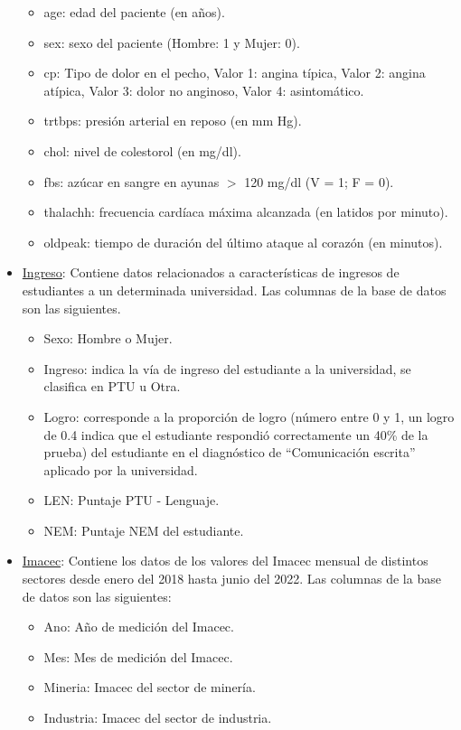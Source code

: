 \documentclass[
  11pt,
]{book}
\providecommand{\tightlist}{%
  \setlength{\itemsep}{0pt}\setlength{\parskip}{0pt}}
\theoremstyle{definition}
\theoremstyle{definition}
\theoremstyle{definition}
\theoremstyle{definition}
\theoremstyle{remark}
\begin{document}
\begin{itemize}
  \begin{itemize}
  \tightlist
  \item
    age: edad del paciente (en años).
  \item
    sex: sexo del paciente (Hombre: 1 y Mujer: 0).
  \item
    cp: Tipo de dolor en el pecho, Valor 1: angina típica, Valor 2: angina atípica, Valor 3: dolor no anginoso, Valor 4: asintomático.
  \item
    trtbps: presión arterial en reposo (en mm Hg).
  \item
    chol: nivel de colestorol (en mg/dl).
  \item
    fbs: azúcar en sangre en ayunas \(>\) 120 mg/dl (V = 1; F = 0).
  \item
    thalachh: frecuencia cardíaca máxima alcanzada (en latidos por minuto).
  \item
    oldpeak: tiempo de duración del último ataque al corazón (en minutos).
  \end{itemize}
\item
  \label{Ingreso}\href{https://raw.githubusercontent.com/Dfranzani/Bases-de-datos-para-cursos/main/2023-1/Ingreso\%2Buniversidad.csv}{Ingreso}: Contiene datos relacionados a características de ingresos de estudiantes a un determinada universidad. Las columnas de la base de datos son las siguientes.

  \begin{itemize}
  \tightlist
  \item
    Sexo: Hombre o Mujer.
  \item
    Ingreso: indica la vía de ingreso del estudiante a la universidad, se clasifica en PTU u Otra.
  \item
    Logro: corresponde a la proporción de logro (número entre 0 y 1, un logro de 0.4 indica que el estudiante respondió correctamente un 40\% de la prueba) del estudiante en el diagnóstico de ``Comunicación escrita'' aplicado por la universidad.
  \item
    LEN: Puntaje PTU - Lenguaje.
  \item
    NEM: Puntaje NEM del estudiante.
  \end{itemize}
\item
  \label{Imacec3}\href{https://raw.githubusercontent.com/Dfranzani/Bases-de-datos-para-cursos/main/2022-2/Estad\%C3\%ADstica\%201/imacec.csv}{Imacec}: Contiene los datos de los valores del Imacec mensual de distintos sectores desde enero del 2018 hasta junio del 2022. Las columnas de la base de datos son las siguientes:

  \begin{itemize}
  \tightlist
  \item
    Ano: Año de medición del Imacec.
  \item
    Mes: Mes de medición del Imacec.
  \item
    Mineria: Imacec del sector de minería.
  \item
    Industria: Imacec del sector de industria.
  \end{itemize}
\end{itemize}
\end{document}
